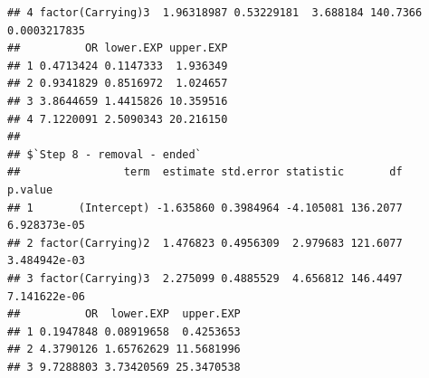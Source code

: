 \documentclass[
]{book}
\newenvironment{Shaded}{\begin{snugshade}}{\end{snugshade}}
\newcommand{\NormalTok}[1]{#1}
\newcommand{\OperatorTok}[1]{\textcolor[rgb]{0.81,0.36,0.00}{\textbf{#1}}}
\begin{document}
\begin{verbatim}
## 4 factor(Carrying)3  1.96318987 0.53229181  3.688184 140.7366 0.0003217835
##          OR lower.EXP upper.EXP
## 1 0.4713424 0.1147333  1.936349
## 2 0.9341829 0.8516972  1.024657
## 3 3.8644659 1.4415826 10.359516
## 4 7.1220091 2.5090343 20.216150
## 
## $`Step 8 - removal - ended`
##                term  estimate std.error statistic       df      p.value
## 1       (Intercept) -1.635860 0.3984964 -4.105081 136.2077 6.928373e-05
## 2 factor(Carrying)2  1.476823 0.4956309  2.979683 121.6077 3.484942e-03
## 3 factor(Carrying)3  2.275099 0.4885529  4.656812 146.4497 7.141622e-06
##          OR  lower.EXP  upper.EXP
## 1 0.1947848 0.08919658  0.4253653
## 2 4.3790126 1.65762629 11.5681996
## 3 9.7288803 3.73420569 25.3470538
\end{verbatim}

\begin{Shaded}
\end{Shaded}
\end{document}
